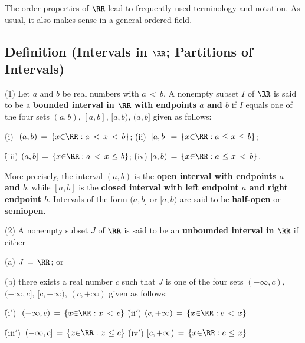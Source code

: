 \V
\V

        The order properties of ${\RR}$ lead to frequently used terminology and notation.
    As usual, it also makes sense in a general ordered field.

\V

            \subsection{\small{\bf Definition} (Intervals in ${\RR}$; Partitions of Intervals)}
            \label{DefB20.130}

\V

        \hspace*{\parindent}(1) Let $a$ and $b$ be real numbers with $a\,<\,b$.
    A nonempty subset $I$ of ${\RR}$ is said to be a
    {\bf bounded interval in ${\RR}$ with endpoints $a$ and $b$} if $I$ equals one of the four sets $(a,b)$, $[a,b]$, $[a,b)$, $(a,b]$ given as follows:

       \h\h (i)\,\, $(a,b) \,=\, \{x{\in}{\RR}: a\,<\,x\,<\,b\}$;
        \h (ii)\, $[a,b] \,=\, \{x{\in}{\RR}: a\,\,{\leq}\,\,x\,\,{\leq}\,\,b\}$;

       \h\h (iii) $(a,b] \,=\, \{x{\in}{\RR}: a\,<\,x\,\,{\leq}\,\,b\}$;
        \h (iv) $[a,b) \,=\, \{x{\in}{\RR}: a\,\,{\leq}\,\,x\,<\,b\}$.

\noindent More precisely, the interval $(a,b)$ is the {\bf open interval with endpoints $a$ and $b$},
    while 
$[a,b]$ is the {\bf closed interval with left endpoint $a$ and right endpoint $b$}.
    Intervals of the form $(a,b]$ or $[a,b)$ are said to be {\bf half-open} or {\bf semiopen}.


\V

        (2) A nonempty subset $J$ of ${\RR}$ is said to be an {\bf unbounded interval in ${\RR}$} if either

        \h (a) $J \,=\, {\RR}$; or

        \h (b) there exists a real number $c$ such that $J$ is one of the four sets $(-{\infty},c)$, $(-{\infty},c]$, $[c,+{\infty})$, $(c,+{\infty})$ given as follows:

\VA

        \h\h (i$'$)\,\, $(-{\infty},c) \,=\, \{x{\in}{\RR}: x\,<\,c\}$
        \h (ii$'$) $(c,+{\infty}) \,=\, \{x{\in}{\RR}: c\,<\,x\}$


        \h\h (iii$'$)\, $(-{\infty},c] \,=\, \{x{\in}{\RR}: x\,\,{\leq}\,\,c\}$
        \h (iv$'$) $[c,+{\infty}) \,=\, \{x{\in}{\RR}: c\,\,{\leq}\,\,x\}$


